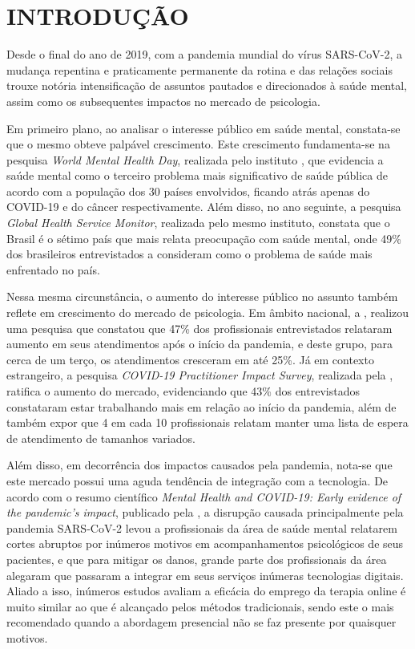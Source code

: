 \chapter{INTRODUÇÃO}
\label{chap:introducao}

Desde o final do ano de 2019, com a pandemia mundial do vírus SARS-CoV-2, a mudança repentina e praticamente permanente da rotina e das relações sociais trouxe notória intensificação de assuntos pautados e direcionados à saúde mental, assim como os subsequentes impactos no mercado de psicologia.

Em primeiro plano, ao analisar o interesse público em saúde mental, constata-se que o mesmo obteve palpável crescimento. Este crescimento fundamenta-se na pesquisa \textit{World Mental Health Day}, realizada pelo instituto , que evidencia a saúde mental como o terceiro problema mais significativo de saúde pública de acordo com a população dos 30 países envolvidos, ficando atrás apenas do COVID-19 e do câncer respectivamente. Além disso, no ano seguinte, a pesquisa \textit{Global Health Service Monitor}, realizada pelo mesmo instituto, constata que o Brasil é o sétimo país que mais relata preocupação com saúde mental, onde 49\% dos brasileiros entrevistados a consideram como o problema de saúde mais enfrentado no país.

Nessa mesma circunstância, o aumento do interesse público no assunto também reflete em crescimento do mercado de psicologia. Em âmbito nacional, a , realizou uma pesquisa que constatou que 47\% dos profissionais entrevistados relataram aumento em seus atendimentos após o início da pandemia, e deste grupo, para cerca de um terço, os atendimentos cresceram em até 25\%. Já em contexto estrangeiro, a pesquisa \textit{COVID-19 Practitioner Impact Survey}, realizada pela , ratifica o aumento do mercado, evidenciando que 43\% dos entrevistados constataram estar trabalhando mais em relação ao início da pandemia, além de também expor que 4 em cada 10 profissionais relatam manter uma lista de espera de atendimento de tamanhos variados.

Além disso, em decorrência dos impactos causados pela pandemia, nota-se que este mercado possui uma aguda tendência de integração com a tecnologia. De acordo com o resumo científico \textit{Mental Health and COVID-19: Early evidence of the pandemic’s impact}, publicado pela , a disrupção causada principalmente pela pandemia SARS-CoV-2 levou a profissionais da área de saúde mental relatarem cortes abruptos por inúmeros motivos em acompanhamentos psicológicos de seus pacientes, e que para mitigar os danos, grande parte dos profissionais da área alegaram que passaram a integrar em seus serviços inúmeras tecnologias digitais. Aliado a isso, inúmeros estudos avaliam a eficácia do emprego da terapia online é muito similar ao que é alcançado pelos métodos tradicionais, sendo este o mais recomendado quando a abordagem presencial não se faz presente por quaisquer motivos.

